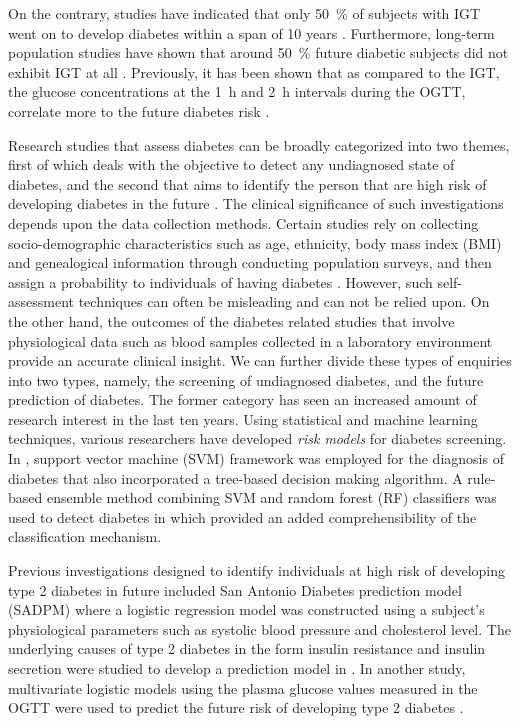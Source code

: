 \documentclass[journal,comsoc]{IEEEtran}
\renewcommand{\^}{\hat}  %
\begin{document}
On the contrary, studies have indicated that only \SI{50}{\percent} of subjects with IGT went on to develop diabetes within a span of \num{10} years \cite{shaw_impaired_1999, writing_committee_impaired_2002}. Furthermore, long-term population studies have shown that around \SI{50}{\percent} future diabetic subjects did not exhibit IGT at all \cite{abdul-ghani_what_2007}. Previously, it has been shown that as compared to the IGT, the glucose concentrations at the \SI{1}{\hour} and \SI{2}{\hour} intervals during the OGTT, correlate more to the future diabetes risk \cite{abdul2009fasting,abdul-ghani_shape_2010,abdul-ghani_plasma_2009}.

Research studies that assess diabetes can be broadly categorized into two themes, first of which deals with the objective to detect any undiagnosed state of diabetes, and the second that aims to identify the person that are high risk of developing diabetes in the future \cite{noble2011risk}. The clinical significance of such investigations depends upon the data collection methods. Certain studies rely on collecting socio-demographic characteristics such as age, ethnicity, body mass index (BMI) and genealogical information through conducting population surveys, and then assign a probability to individuals of having diabetes \cite{Heikes1040,Glumer727}.  However, such self-assessment techniques can often be misleading and can not be relied upon. On the other hand, the outcomes of the diabetes related studies that involve physiological data such as blood samples collected in a laboratory environment provide an accurate clinical insight. We can further divide these types of enquiries into two types, namely, the screening  of undiagnosed diabetes, and the future prediction of diabetes. The former category has seen an increased amount of research interest in the last ten years. Using statistical and machine learning techniques, various researchers have developed \emph{risk models} for diabetes screening. In \cite{barakat_intelligible_2010}, support vector machine (SVM) framework was employed for the diagnosis of diabetes that also incorporated a tree-based decision making algorithm. A rule-based ensemble method combining SVM and random forest (RF)
classifiers was used to detect diabetes in \cite{han_rule_2015} which provided an added comprehensibility of the classification mechanism.

Previous investigations designed to identify individuals at high risk of developing type 2 diabetes in future included San Antonio Diabetes prediction model (SADPM) \cite{stern2002identification} where a logistic regression model was constructed using a subject's physiological parameters such as systolic blood pressure and cholesterol level. The underlying causes of type 2 diabetes in the form insulin resistance and insulin secretion were studied to develop a prediction model in \cite{abdul-ghani_what_2007}. In another study,  multivariate logistic models using the plasma glucose values measured in the OGTT were used to predict the future risk of developing type 2 diabetes \cite{abdul-ghani_two-step_2011,abdul2009fasting}.
\end{document}
